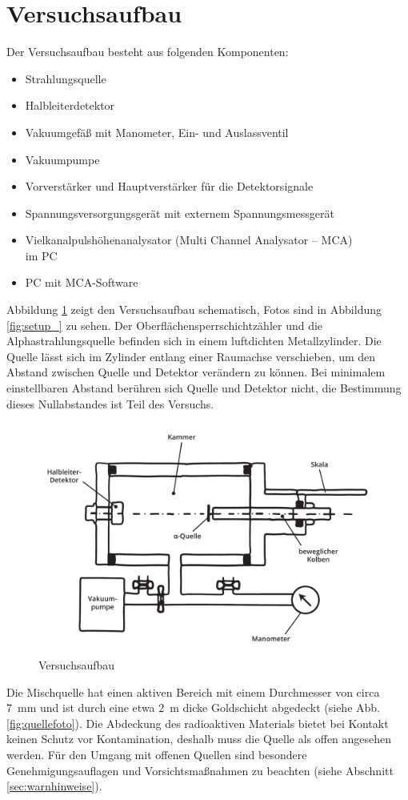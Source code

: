\clearpage
\section{Versuchsaufbau}
Der Versuchsaufbau besteht aus folgenden Komponenten:
\begin{itemize}
	\item Strahlungsquelle
	\item Halbleiterdetektor
	\item Vakuumgefäß mit Manometer, Ein- und Auslassventil
	\item Vakuumpumpe
	\item Vorverstärker und Hauptverstärker für die Detektorsignale
	\item Spannungsversorgungsgerät mit externem Spannungsmessgerät
	\item Vielkanalpulshöhenanalysator (Multi Channel Analysator -- MCA)\\im PC
	\item PC mit MCA-Software
\end{itemize}

Abbildung \ref{fig:aufbauhalbleiter} zeigt den Versuchsaufbau schematisch, Fotos sind in Abbildung \ref{fig:setup_} zu sehen. Der Oberflächensperrschichtzähler und die Alphastrahlungsquelle befinden sich in einem luftdichten Metallzylinder. Die Quelle lässt sich im Zylinder entlang einer Raumachse verschieben, um den Abstand zwischen Quelle und Detektor verändern zu können. Bei minimalem einstellbaren Abstand berühren sich Quelle und Detektor nicht, die Bestimmung dieses Nullabstandes ist Teil des Versuchs.
\begin{figure}[h]
	\centering
	\includegraphics[width=0.7\linewidth]{img/aufbau_halbleiter}
	\caption{Versuchsaufbau}
	\label{fig:aufbauhalbleiter}
\end{figure}

Die Mischquelle hat einen aktiven Bereich mit einem Durchmesser von circa 7~mm und ist durch eine etwa 2~\textmu m dicke Goldschicht abgedeckt (siehe Abb. \ref{fig:quellefoto}). Die Abdeckung des radioaktiven Materials bietet bei Kontakt keinen Schutz vor Kontamination, deshalb muss die Quelle als offen angesehen werden. Für den Umgang mit offenen Quellen sind besondere Genehmigungsauflagen und Vorsichtsmaßnahmen zu beachten (siehe Abschnitt \ref{sec:warnhinweise}).

